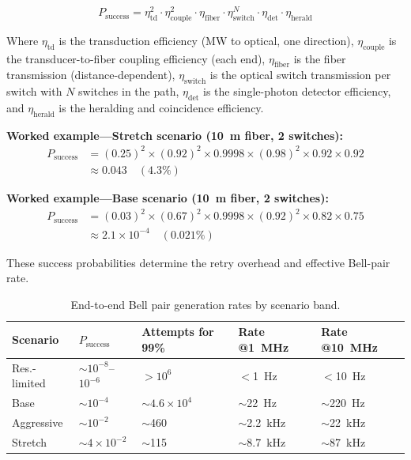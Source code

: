 \documentclass[conference]{IEEEtran}
\begin{document}
\begin{equation}
P_{\text{success}} = \eta_{\text{td}}^2 \cdot \eta_{\text{couple}}^2 \cdot \eta_{\text{fiber}} \cdot \eta_{\text{switch}}^N \cdot \eta_{\text{det}} \cdot \eta_{\text{herald}}
\end{equation}

Where $\eta_{\text{td}}$ is the transduction efficiency (MW to optical, one direction), $\eta_{\text{couple}}$ is the transducer-to-fiber coupling efficiency (each end), $\eta_{\text{fiber}}$ is the fiber transmission (distance-dependent), $\eta_{\text{switch}}$ is the optical switch transmission per switch with $N$ switches in the path, $\eta_{\text{det}}$ is the single-photon detector efficiency, and $\eta_{\text{herald}}$ is the heralding and coincidence efficiency.

\textbf{Worked example---Stretch scenario (10~m fiber, 2 switches):}
\begin{align*}
P_{\text{success}} &= (0.25)^2 \times (0.92)^2 \times 0.9998 \times (0.98)^2 \times 0.92 \times 0.92 \\
&\approx 0.043 \quad (4.3\%)
\end{align*}

\textbf{Worked example---Base scenario (10~m fiber, 2 switches):}
\begin{align*}
P_{\text{success}} &= (0.03)^2 \times (0.67)^2 \times 0.9998 \times (0.92)^2 \times 0.82 \times 0.75 \\
&\approx 2.1 \times 10^{-4} \quad (0.021\%)
\end{align*}

These success probabilities determine the retry overhead and effective Bell-pair rate.

\begin{table}[H]
\centering
\caption{End-to-end Bell pair generation rates by scenario band.}
\label{tab:bell-pair-rate}
\footnotesize
\begin{tabularx}{\columnwidth}{L{1.5cm}L{1.3cm}L{1.3cm}L{1.3cm}L{1.3cm}}
\toprule
\textbf{Scenario} & \textbf{$P_{\text{success}}$} & \textbf{Attempts for 99\%} & \textbf{Rate @1~MHz} & \textbf{Rate @10~MHz} \\
\midrule
Res.-limited & $\sim$$10^{-8}$--$10^{-6}$ & $>$$10^6$ & $<$1~Hz & $<$10~Hz \\
Base & $\sim$$10^{-4}$ & $\sim$$4.6 \times 10^4$ & $\sim$22~Hz & $\sim$220~Hz \\
Aggressive & $\sim$$10^{-2}$ & $\sim$460 & $\sim$2.2~kHz & $\sim$22~kHz \\
Stretch & $\sim$$4 \times 10^{-2}$ & $\sim$115 & $\sim$8.7~kHz & $\sim$87~kHz \\
\bottomrule
\end{tabularx}
\end{table}
\end{document}
